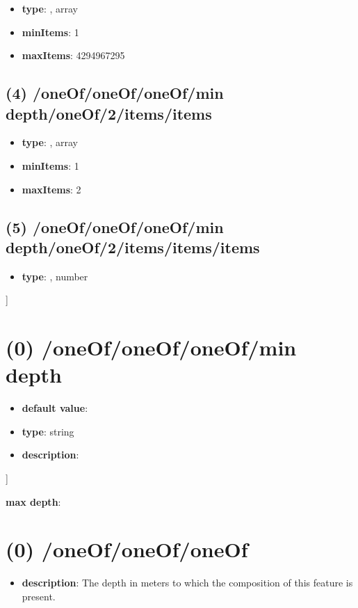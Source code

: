 \begin{itemize}[leftmargin=3em]\item {\bf type}: , array\item {\bf minItems}: 1
\item {\bf maxItems}: 4294967295
\end{itemize}\subsection{(4) /oneOf/oneOf/oneOf/min depth/oneOf/2/items/items}
\begin{itemize}[leftmargin=4em]\item {\bf type}: , array\item {\bf minItems}: 1
\item {\bf maxItems}: 2
\end{itemize}\subsection{(5) /oneOf/oneOf/oneOf/min depth/oneOf/2/items/items/items}
\begin{itemize}[leftmargin=5em]\item {\bf type}: , number\end{itemize}]\section{(0) /oneOf/oneOf/oneOf/min depth}
\begin{itemize}[leftmargin=0em]\item {\bf default value}: 
\item {\bf type}: string
\item {\bf description}: 
\end{itemize}]\item {\bf max depth}: \section{(0) /oneOf/oneOf/oneOf}
\begin{itemize}[leftmargin=0em]\item {\bf description}: The depth in meters to which the composition of this feature is present.
\end{itemize}
